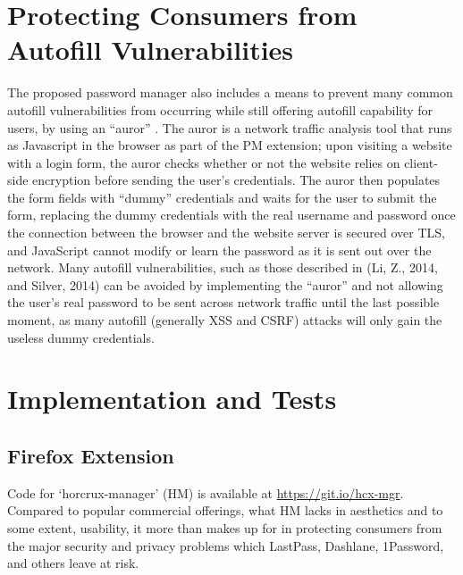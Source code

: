 \documentclass[conference]{IEEEtran}
\begin{document}
\section{Protecting Consumers from Autofill Vulnerabilities}
The proposed password manager also includes a means to prevent many common
autofill vulnerabilities from occurring while still offering autofill capability
for users, by using an ``auror'' . The auror is a network traffic analysis tool
that runs as Javascript in the browser as part of the PM extension; upon
visiting a website with a login form, the auror checks whether or not the
website relies on client-side encryption before sending the user's credentials. 
The auror then populates the form fields with ``dummy''
credentials and waits for the user to submit the form, replacing the
dummy credentials with the real username and password once the connection
between the browser and the website server is secured over TLS, and JavaScript
cannot modify or learn the password as it is sent out over the network. Many
autofill vulnerabilities, such as those described in (Li, Z., 2014, and Silver,
2014) can be avoided by implementing the ``auror'' and not allowing the user's
real password to be sent across network traffic until the last possible moment,
as many autofill (generally XSS and CSRF) attacks will only gain the useless
dummy credentials.

\section{Implementation and Tests}
\subsection{Firefox Extension}
Code for `horcrux-manager' (HM) is available at \url{https://git.io/hcx-mgr}.
Compared to popular commercial offerings, what HM lacks in aesthetics and to
some extent, usability, it more than makes up for in protecting consumers from
the major security and privacy problems which LastPass, Dashlane, 1Password, and
others leave at risk.
\end{document}
